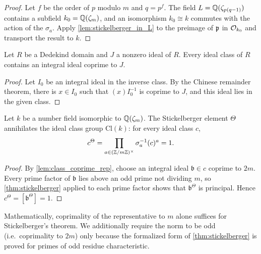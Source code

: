 \begin{proof}
  \leanok
  Let $f$ be the order of $p$ modulo $m$ and $q = p^f$. The field
  $L = \mathbb{Q}(\zeta_{p(q-1)})$ contains a subfield $k_0 = \mathbb{Q}(\zeta_m)$, and an isomorphism
  $k_0 \cong k$ commutes with the action of the $\sigma_a$. Apply
  \ref{lem:stickelberger_in_L} to the preimage of $\mathfrak{p}$ in $\mathcal{O}_{k_0}$ and transport the
  result to $k$.
\end{proof}

\begin{lemma}
  \label{lem:class_coprime_rep}
  \leanok
  Let $R$ be a Dedekind domain and $J$ a nonzero ideal of $R$. Every ideal class of $R$
  contains an integral ideal coprime to $J$.
\end{lemma}

\begin{proof}
  \leanok
  Let $I_0$ be an integral ideal in the inverse class. By the Chinese remainder theorem, there is
  $x \in I_0$ such that $(x) I_0^{-1}$ is coprime to $J$, and this ideal lies in the given class.
\end{proof}

\begin{corollary}
  \label{cor:stickelberger_annihilates}
  \leanok
  Let $k$ be a number field isomorphic to $\mathbb{Q}(\zeta_m)$. The Stickelberger element $\Theta$
  annihilates the ideal class group $\mathrm{Cl}(k)$: for every ideal class $c$,
  \[
    c^{\Theta} = \prod_{a \in (\mathbb{Z}/m\mathbb{Z})^\times} \sigma_a^{-1}(c)^{a} = 1.
  \]
\end{corollary}

\begin{proof}
  \leanok
  By \ref{lem:class_coprime_rep}, choose an integral ideal $\mathfrak{b} \in c$ coprime to
  $2m$. Every prime factor of $\mathfrak{b}$ lies above an odd prime not dividing $m$, so
  \ref{thm:stickelberger} applied to each prime factor shows that $\mathfrak{b}^{\Theta}$ is
  principal. Hence $c^{\Theta} = [\mathfrak{b}^{\Theta}] = 1$.
\end{proof}

\begin{remark}
  Mathematically, coprimality of the representative to $m$ alone suffices for
  Stickelberger's theorem. We additionally require the norm to be odd (i.e.\
  coprimality to $2m$) only because the formalized form of \ref{thm:stickelberger}
  is proved for primes of odd residue characteristic.
\end{remark}

